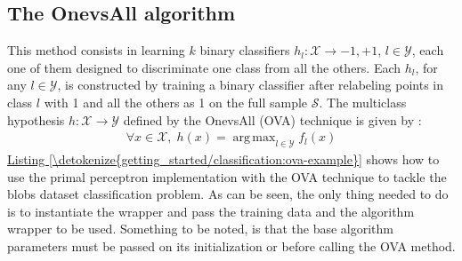 \documentclass[letterpaper,10pt,english]{sphinxmanual}
\begin{document}
\subsection{The One\sphinxhyphen{}vs\sphinxhyphen{}All algorithm}
\label{\detokenize{getting_started/classification:the-one-vs-all-algorithm}}
\sphinxAtStartPar
This method consists in learning \(k\) binary classifiers \(h_l:\mathcal{X} \rightarrow {-1, +1}\), \(l \in \mathcal{Y}\), each one of them
designed to discriminate one class from all the others. Each \(h_l\), for any \(l \in \mathcal{Y}\), is constructed by training a binary classifier after
relabeling points in class \(l\) with 1 and all the others as \sphinxhyphen{}1 on the full sample \(\mathcal{S}\). The multi\sphinxhyphen{}class hypothesis \(h:\mathcal{X} \rightarrow \mathcal{Y}\) defined by the
One\sphinxhyphen{}vs\sphinxhyphen{}All (OVA) technique is given by :
\begin{equation*}
\begin{split}\forall x \in \mathcal{X},\; h(x) = \mathop{arg\,max}_{l\in\mathcal{Y}}f_l(x)\end{split}
\end{equation*}
\sphinxAtStartPar
\hyperref[\detokenize{getting_started/classification:ova-example}]{Listing \ref{\detokenize{getting_started/classification:ova-example}}} shows how to use the  primal perceptron implementation with the OVA technique to tackle the blobs dataset classification problem.
As can be seen, the only thing needed to do is to instantiate the  wrapper and pass the training data and the algorithm wrapper to be used. Something to be noted, is that
the base algorithm parameters must be passed on its initialization or before calling the OVA  method.
\def\sphinxLiteralBlockLabel{\label{\detokenize{getting_started/classification:ova-example}}}
%
\end{document}
